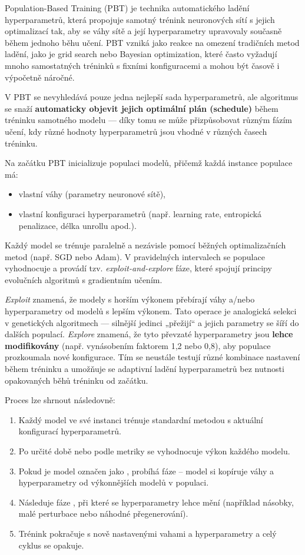 Population-Based Training (PBT)\cite{Jaderberg2017} je technika automatického ladění hyperparametrů, která propojuje samotný trénink neuronových sítí s jejich optimalizací tak, aby se váhy sítě a její hyperparametry upravovaly současně během jednoho běhu učení. PBT vzniká jako reakce na omezení tradičních metod ladění, jako je grid search nebo Bayesian optimization, které často vyžadují mnoho samostatných tréninků s fixními konfiguracemi a mohou být časově i výpočetně náročné.

V PBT se nevyhledává pouze jedna nejlepší sada hyperparametrů, ale algoritmus se snaží \textbf{automaticky objevit jejich optimální plán (schedule)} během tréninku samotného modelu — díky tomu se může přizpůsobovat různým fázím učení, kdy různé hodnoty hyperparametrů jsou vhodné v různých časech tréninku.

Na začátku PBT inicializuje populaci modelů, přičemž každá instance populace má:
\begin{itemize}
    \item vlastní váhy (parametry neuronové sítě),
    \item vlastní konfiguraci hyperparametrů (např. learning rate, entropická penalizace, délka unrollu apod.).
\end{itemize}

Každý model se trénuje paralelně a nezávisle pomocí běžných optimalizačních metod (např. SGD nebo Adam). V pravidelných intervalech se populace vyhodnocuje a provádí tzv. \textit{exploit-and-explore} fáze, které spojují principy evolučních algoritmů s gradientním učením.

\textit{Exploit} znamená, že modely s horším výkonem přebírají váhy a/nebo hyperparametry od modelů s lepším výkonem. Tato operace je analogická selekci v genetických algoritmech — silnější jedinci „přežijí“ a jejich parametry se šíří do dalších populací. 
\textit{Explore} znamená, že tyto převzaté hyperparametry jsou \textbf{lehce modifikovány} (např. vynásobením faktorem 1{,}2 nebo 0{,}8), aby populace prozkoumala nové konfigurace. Tím se neustále testují různé kombinace nastavení během tréninku a umožňuje se adaptivní ladění hyperparametrů bez nutnosti opakovaných běhů tréninku od začátku.

Proces lze shrnout následovně:
\begin{enumerate}
    \item Každý model ve své instanci trénuje standardní metodou s aktuální konfigurací hyperparametrů.
    \item Po určité době nebo podle metriky se vyhodnocuje výkon každého modelu.
    \item Pokud je model označen jako , probíhá fáze  – model si kopíruje váhy a hyperparametry od výkonnějších modelů v populaci.
    \item Následuje fáze , při které se hyperparametry lehce mění (například násobky, malé perturbace nebo náhodné přegenerování).
    \item Trénink pokračuje s nově nastavenými vahami a hyperparametry a celý cyklus se opakuje.
\end{enumerate}

